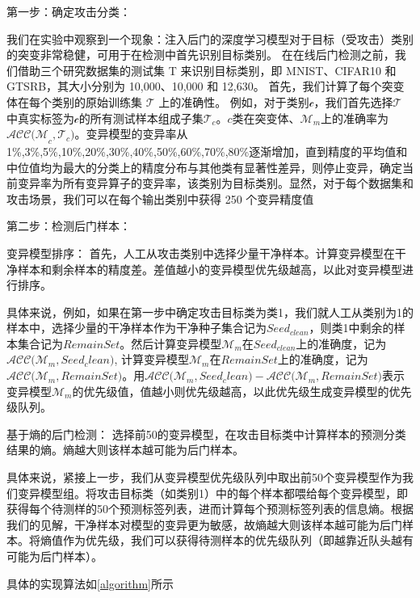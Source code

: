 \documentclass[fontset=macnew,UTF8]{article} %
\begin{document}
第一步：确定攻击分类：

我们在实验中观察到一个现象：注入后门的深度学习模型对于目标（受攻击）类别的突变非常稳健，可用于在检测中首先识别目标类别。 在在线后门检测之前，我们借助三个研究数据集的测试集 T 来识别目标类别，即 MNIST、CIFAR10 和 GTSRB，其大小分别为 10,000、10,000 和 12,630。
首先，我们计算了每个突变体在每个类别的原始训练集 $\mathcal{T}$ 上的准确性。 例如，对于类别$\mathcal{c}$，我们首先选择$\mathcal{T}$ 中真实标签为$\mathcal{c}$的所有测试样本组成子集$\mathcal{T}_c$。$c$类在突变体、$\mathcal{M}_m$上的准确率为$\mathcal{ACC(M}_c,\mathcal{T}_c)$。变异模型的变异率从1\%,3\%,5\%,10\%,20\%,30\%,40\%,50\%,60\%,70\%,80\%逐渐增加，直到精度的平均值和中位值均为最大的分类上的精度分布与其他类有显著性差异，则停止变异，确定当前变异率为所有变异算子的变异率，该类别为目标类别。显然，对于每个数据集和攻击场景，我们可以在每个输出类别中获得 250 个变异精度值

第二步：检测后门样本：

变异模型排序：
首先，人工从攻击类别中选择少量干净样本。计算变异模型在干净样本和剩余样本的精度差。差值越小的变异模型优先级越高，以此对变异模型进行排序。

具体来说，例如，如果在第一步中确定攻击目标类为类1，我们就人工从类别为1的样本中，选择少量的干净样本作为干净种子集合记为$Seed_{clean}$，则类1中剩余的样本集合记为$RemainSet$。然后计算变异模型$\mathcal{M}_m$在$Seed_{clean}$上的准确度，记为$\mathcal{ACC(}\mathcal{M}_m, Seed_clean\mathcal{)}$,  计算变异模型$\mathcal{M}_m$在$RemainSet$上的准确度，记为$\mathcal{ACC(}\mathcal{M}_m, RemainSet\mathcal{)}$。用$\mathcal{ACC(}\mathcal{M}_m,Seed_clean\mathcal{)}-\mathcal{ACC(}\mathcal{M}_m,RemainSet\mathcal{)}$表示变异模型$\mathcal{M}_m$的优先级值，值越小则优先级越高，以此优先级生成变异模型的优先级队列。

基于熵的后门检测：
选择前50的变异模型，在攻击目标类中计算样本的预测分类结果的熵。熵越大则该样本越可能为后门样本。

具体来说，紧接上一步，我们从变异模型优先级队列中取出前50个变异模型作为我们变异模型组。将攻击目标类（如类别1）中的每个样本都喂给每个变异模型，即获得每个待测样的50个预测标签列表，进而计算每个预测标签列表的信息熵。根据我们的见解，干净样本对模型的变异更为敏感，故熵越大则该样本越可能为后门样本。将熵值作为优先级，我们可以获得待测样本的优先级队列（即越靠近队头越有可能为后门样本）。

具体的实现算法如\ref{algorithm}所示
\end{document}
